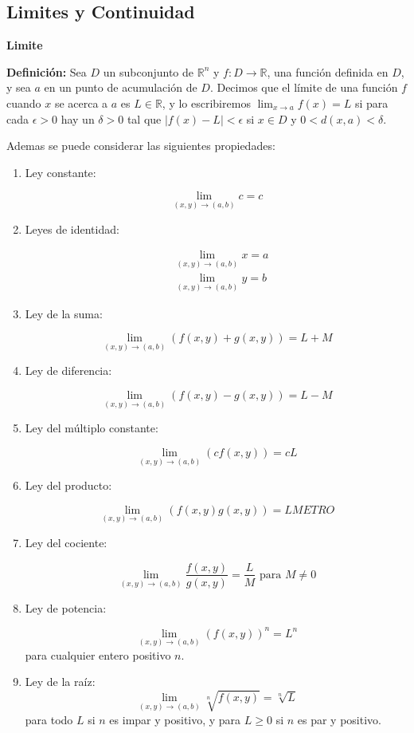 \subsection{Limites y Continuidad}
\textbf{Limite}\par
\textbf{Definición:} Sea $D$ un subconjunto de $\mathbb{R}^{n}$ y $f: D \rightarrow \mathbb{R}$, una función definida en $D$, y sea $a$ en un punto de acumulación de $D$. Decimos que el límite de una función $f$ cuando $x$ se acerca a $a$ es $L \in \mathbb{R}$, y lo escribiremos $\lim _{x \rightarrow a} f(x)=L$ si para cada $\epsilon>0$ hay un $\delta>0$ tal que $|f(x)-L|<\epsilon$ si $x \in D$ y $0<d(x, a)<\delta$.\par
Ademas se puede considerar las siguientes propiedades:\par
\begin{enumerate}
    \item Ley constante:\par
          $$
              \lim _{(x, y) \rightarrow(a, b)} c=c
          $$
    \item Leyes de identidad:\par
          $$
              \begin{aligned}
                   & \lim _{(x, y) \rightarrow(a, b)} x=a \\
                   & \lim _{(x, y) \rightarrow(a, b)} y=b
              \end{aligned}
          $$
    \item Ley de la suma:\par
          $$
              \lim _{(x, y) \rightarrow(a, b)}(f(x, y)+g(x, y))=L+M
          $$
    \item Ley de diferencia:\par
          $$
              \lim _{(x, y) \rightarrow(a, b)}(f(x, y)-g(x, y))=L-M
          $$
    \item Ley del múltiplo constante:\par
          $$
              \lim _{(x, y) \rightarrow(a, b)}(c f(x, y))=c L
          $$
    \item Ley del producto:\par
          $$
              \lim _{(x, y) \rightarrow(a, b)}(f(x, y) g(x, y))=L METRO
          $$
    \item Ley del cociente:\par
          $$
              \lim _{(x, y) \rightarrow(a, b)} \frac{f(x, y)}{g(x, y)}=\frac{L}{M} \text { para } M \neq 0
          $$
    \item Ley de potencia:\par
          $$
              \lim _{(x, y) \rightarrow(a, b)}(f(x, y))^{n}=L^{n}
          $$
          para cualquier entero positivo $n$.\par
    \item Ley de la raíz:
          $$
              \lim _{(x, y) \rightarrow(a, b)} \sqrt[n]{f(x, y)}=\sqrt[n]{L}
          $$
          para todo $L$ si $n$ es impar y positivo, y para $L \geq 0$ si $n$ es par y positivo.\par
\end{enumerate}
